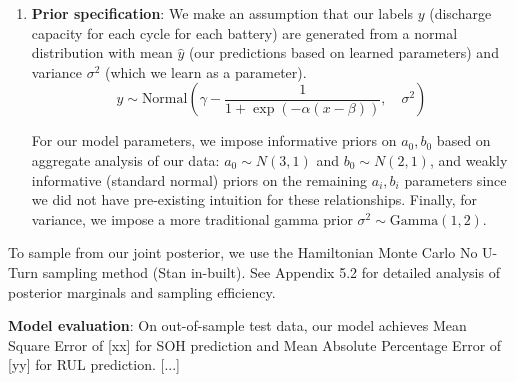 \documentclass{article}
\begin{document}
\begin{enumerate}
    \item \textbf{Prior specification}: We make an assumption that our labels $y$ (discharge capacity for each cycle for each battery) are generated from a normal distribution with mean $\hat{y}$ (our predictions based on learned parameters) and variance $\sigma^2$ (which we learn as a parameter).
    $$ y \sim \text{Normal}\left(\gamma - \frac{1}{1+\exp(-\alpha(x-\beta))}, \quad \sigma^2\right)$$

    For our model parameters, we impose informative priors on $a_0, b_0$ based on aggregate analysis of our data: $a_0 \sim N(3,1)$ and $b_0 \sim N(2,1)$, and weakly informative (standard normal) priors on the remaining $a_i, b_i$ parameters since we did not have pre-existing intuition for these relationships. Finally, for variance, we impose a more traditional gamma prior $\sigma^2 \sim \text{Gamma}(1, 2)$.

\end{enumerate}

To sample from our joint posterior, we use the Hamiltonian Monte Carlo No U-Turn sampling method (Stan in-built). See Appendix 5.2 for detailed analysis of posterior marginals and sampling efficiency. \newline

\textbf{Model evaluation}: On out-of-sample test data, our model achieves Mean Square Error of [xx] for SOH prediction and Mean Absolute Percentage Error of [yy] for RUL prediction. [...]
\end{document}
